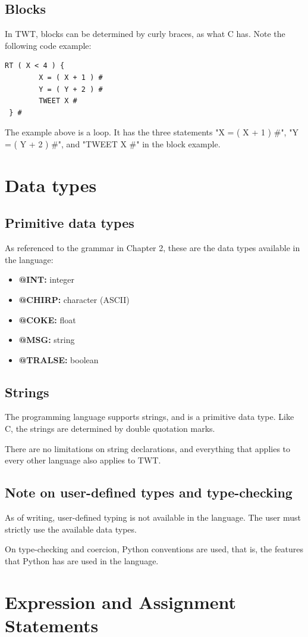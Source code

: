 \documentclass[11pt,a4paper]{report}
\begin{document}
\section{Blocks}

In TWT, blocks can be determined by curly braces, as what C has. Note the
following code example:

\begin{lstlisting}
RT ( X < 4 ) { 
		X = ( X + 1 ) #
		Y = ( Y + 2 ) #
		TWEET X #
 } #
\end{lstlisting}

The example above is a loop. It has the three statements "X = ( X + 1 ) \#", "Y
= ( Y + 2 ) \#", and "TWEET X \#" in the block example.

\chapter{Data types}

\section{Primitive data types}

As referenced to the grammar in Chapter 2, these are the data types available in
the language:

\begin{itemize}
  \item \textbf{@INT:} integer
  \item \textbf{@CHIRP:} character (ASCII)
  \item \textbf{@COKE:} float
  \item \textbf{@MSG:} string
  \item \textbf{@TRALSE:} boolean
\end{itemize}

\section{Strings}

The programming language supports strings, and is a primitive data type. Like C,
the strings are determined by double quotation marks.\par

There are no limitations on string declarations, and everything that applies to
every other language also applies to TWT.

\section{Note on user-defined types and type-checking}

As of writing, user-defined typing is not available in the language. The user
must strictly use the available data types.\par

On type-checking and coercion, Python conventions are used, that is, the
features that Python has are used in the language.

\chapter{Expression and Assignment Statements}
\end{document}
